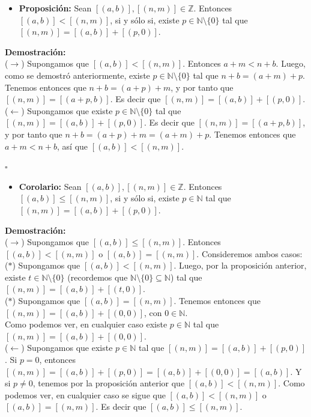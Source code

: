 \documentclass[10 pt]{article}
\begin{document}
\begin{itemize}
    \item \Large{\textbf{Proposición:} Sean $[(a,b)],[(n,m)] \in \mathbb Z$. Entonces $[(a,b)]<[(n,m)]$, si y sólo si, existe $p \in \mathbb N \setminus \{0\}$ tal que $[(n,m)]=[(a,b)]+[(p,0)]$.} \\
\end{itemize}

\Large{\textbf{Demostración:} \\

($\rightarrow$) Supongamos que $[(a,b)]<[(n,m)]$. Entonces $a+m<n+b$. Luego, como se demostró anteriormente, existe $p \in \mathbb N \setminus \{0\}$ tal que $n+b=(a+m)+p$. Tenemos entonces que $n+b=(a+p)+m$, y por tanto que $[(n,m)]=[(a+p,b)]$. Es decir que $[(n,m)]=[(a,b)]+[(p,0)]$. \\

($\leftarrow$) Supongamos que existe $p \in \mathbb N \setminus \{0\}$ tal que $[(n,m)]=[(a,b)]+[(p,0)]$. Es decir que $[(n,m)]=[(a+p,b)]$, y por tanto que $n+b=(a+p)+m=(a+m)+p$. Tenemos entonces que $a+m<n+b$, así que $[(a,b)]<[(n,m)]$.} \\

\begin{flushright}
    $\square$
\end{flushright}

\begin{itemize}
    \item \Large{\textbf{Corolario:} Sean $[(a,b)],[(n,m)] \in \mathbb Z$. Entonces $[(a,b)] \leq [(n,m)]$, si y sólo si, existe $p \in \mathbb N$ tal que $[(n,m)]=[(a,b)]+[(p,0)]$.} \\
\end{itemize}

\Large{\textbf{Demostración:} \\

($\rightarrow$) Supongamos que $[(a,b)] \leq [(n,m)]$. Entonces $[(a,b)]<[(n,m)]$ o $[(a,b)]=[(n,m)]$. Consideremos ambos casos: \\

($\ast$) Supongamos que $[(a,b)]<[(n,m)]$. Luego, por la proposición anterior, existe $t \in \mathbb N \setminus \{0\}$ (recordemos que $\mathbb N \setminus \{0\} \subseteq \mathbb N$) tal que $[(n,m)]=[(a,b)]+[(t,0)]$. \\

($\ast$) Supongamos que $[(a,b)]=[(n,m)]$. Tenemos entonces que $[(n,m)]=[(a,b)]+[(0,0)]$, con $0 \in \mathbb N$. \\

Como podemos ver, en cualquier caso existe $p \in \mathbb N$ tal que $[(n,m)]=[(a,b)]+[(0,0)]$. \\

($\leftarrow$) Supongamos que existe $p \in \mathbb N$ tal que $[(n,m)]=[(a,b)]+[(p,0)]$. Si $p=0$, entonces $[(n,m)]=[(a,b)]+[(p,0)]=[(a,b)]+[(0,0)]=[(a,b)]$. Y si $p \neq 0$, tenemos por la proposición anterior que $[(a,b)]<[(n,m)]$. Como podemos ver, en cualquier caso se sigue que $[(a,b)]<[(n,m)]$ o $[(a,b)]=[(n,m)]$. Es decir que $[(a,b)] \leq [(n,m)]$.} \\
\end{document}
